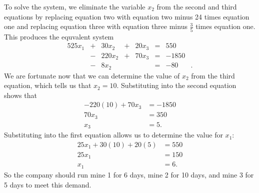 \begin{example}
 To solve the system, we eliminate the variable $x_2$ from the second and third equations by replacing equation two with equation two minus 24 times equation one and replacing equation three with equation three minus $\frac{3}{5}$ times equation one. This produces the equvalent system 
\begin{alignat*}{5}
{25}x_1  	&{}+{}	&{30}x_2	&{}+{} 	&{20}x_3	&{}={} 	&{}550&{}  \\
{}  		&{}-{}  	&{220}x_2	&{}+{}  	&{70}x_3 	&{}={} 	&{-}1850&{}  \\
{}    		&{}-{}	&{8}x_2  	&{}{}  	&{}   		&{}={}	&{-}80&{.}
 \end{alignat*}  
We are fortunate now that we can determine the value of $x_2$ from the third equation, which tells us that $x_2 = 10$. Substituting into the second equation shows that 
\begin{align*}
-220(10) + 70x_3 &= -1850 \\
70x_3 &= 350 \\
x_3 &= 5.
\end{align*}
Substituting into the first equation allows us to determine the value for $x_1$:
 \begin{align*}
 25x_1 + 30(10) + 20(5) &= 550 \\
 25x_1 &= 150 \\
 x_1 &= 6.
 \end{align*}
So the company should run mine 1 for 6 days, mine 2 for 10 days, and mine 3 for 5 days to meet this demand.

\end{example}

